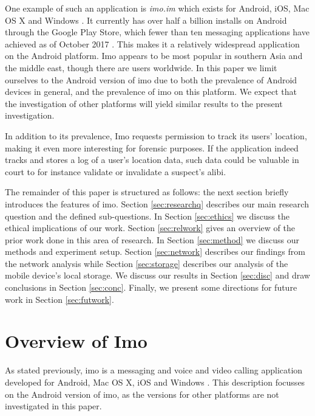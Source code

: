 \documentclass[conference]{IEEEtran}
\begin{document}
One example of such an application is {\it imo.im} which exists for Android,
iOS, Mac OS X and Windows \cite{imo}. It currently has over half a billion
installs on Android through the Google Play Store, which fewer than ten
messaging applications have achieved as of October 2017
\cite{wiki-gplay-popular}. This makes it a relatively widespread application on
the Android platform. Imo appears to be most popular in southern Asia and the
middle east, though there are users worldwide\footnotemark. In this paper we
limit ourselves to the Android version of imo due to both the prevalence of
Android devices in general, and the prevalence of imo on this platform. We
expect that the investigation of other platforms will yield similar results to
the present investigation.

In addition to its prevalence, Imo requests permission to track its users'
location, making it even more interesting for forensic purposes. If the
application indeed tracks and stores a log of a user's location data, such data
could be valuable in court to for instance validate or invalidate a suspect's
alibi.

The remainder of this paper is structured as follows: the next section briefly
introduces the features of imo. Section \ref{sec:researchq} describes our main
research question and the defined sub-questions. In Section \ref{sec:ethics} we
discuss the ethical implications of our work. Section \ref{sec:relwork} gives
an overview of the prior work done in this area of research. In Section
\ref{sec:method} we discuss our methods and experiment setup. Section
\ref{sec:network} describes our findings from the network analysis while
Section \ref{sec:storage} describes our analysis of the mobile device's local
storage. We discuss our results in Section \ref{sec:disc} and draw conclusions
in Section \ref{sec:conc}. Finally, we present some directions for future work
in Section \ref{sec:futwork}.




\section{Overview of Imo}

As stated previously, imo is a messaging and voice and video calling application
developed for Android, Mac OS X, iOS and Windows \cite{imo}. This description
focusses on the Android version of imo, as the versions for other platforms are
not investigated in this paper.
\end{document}
